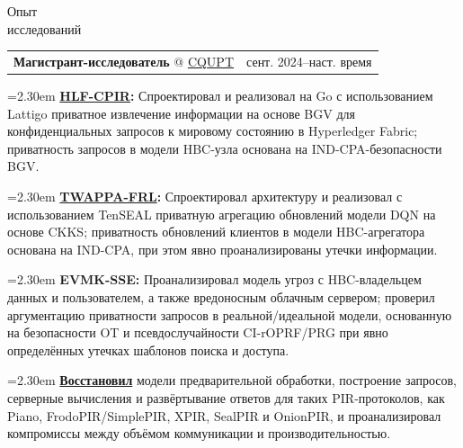 \documentclass[11pt,a4paper]{article}
\makeatletter
\newcommand{\cvrow}[2]{%
  \noindent
  \begin{minipage}[t]{0.145\textwidth}
    \vspace{0pt}%
    \raggedright
    \fontsize{10.5}{12.5}\selectfont
    #1
  \end{minipage}%
  \hfill
  \begin{minipage}[t]{0.835\textwidth}
    \vspace{0pt}%
    #2
  \end{minipage}\par
}
\newcommand{\workentry}[2]{%
  \noindent
  \begin{tabularx}{\linewidth}
    {@{}X@{\hspace{0.8em}}r@{}}
    #1 & \small #2
  \end{tabularx}\par
  \vspace{0.15em}
}
\newcommand{\workproject}[1]{%
  \noindent
  \hangindent=2.30em
  \hangafter=1
  \hspace*{1.15em}\makebox[1.15em][l]{$\diamond$}#1\par
  \vspace{0.12em}
}
\makeatother
\begin{document}
\cvrow{Опыт\\исследований}{%
  \workentry
    {\textbf{Магистрант-исследователь} @
    \href{https://www.cqupt.edu.cn/}{CQUPT}}
    {сент. 2024--наст. время}

  \workproject{\textbf{\href{https://github.com/iasenovets/2_2_HLF_CPIR}{HLF-CPIR}:}
  Спроектировал и реализовал на Go с использованием Lattigo приватное
  извлечение информации на основе BGV для конфиденциальных запросов
  к мировому состоянию в Hyperledger Fabric; приватность запросов
  в модели HBC-узла основана на IND-CPA-безопасности BGV.}

  \workproject{\textbf{\href{https://github.com/hetiantian10/TWAPPA-FRL}{TWAPPA-FRL}:}
  Спроектировал архитектуру и реализовал с использованием TenSEAL приватную
  агрегацию обновлений модели DQN на основе CKKS; приватность обновлений
  клиентов в модели HBC-агрегатора основана на IND-CPA, при этом явно
  проанализированы утечки информации.}

  \workproject{\textbf{EVMK-SSE:} Проанализировал модель угроз с HBC-владельцем
  данных и пользователем, а также вредоносным облачным сервером; проверил
  аргументацию приватности запросов в реальной/идеальной модели, основанную
  на безопасности OT и псевдослучайности CI-rOPRF/PRG при явно определённых
  утечках шаблонов поиска и доступа.}



  \workproject{\textbf{\href{https://iasenovets.github.io/pir-schemes}{Восстановил}}
  модели предварительной обработки, построение запросов, серверные вычисления
  и развёртывание ответов для таких PIR-протоколов, как Piano,
  FrodoPIR/SimplePIR, XPIR, SealPIR и OnionPIR, и проанализировал компромиссы
  между объёмом коммуникации и производительностью.}
}

\vspace{0.75em}
\end{document}
